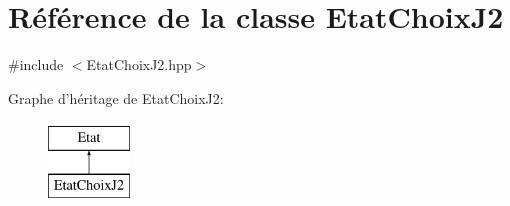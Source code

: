 \hypertarget{class_etat_choix_j2}{\section{Référence de la classe Etat\-Choix\-J2}
\label{class_etat_choix_j2}
}


{\ttfamily \#include $<$Etat\-Choix\-J2.\-hpp$>$}

Graphe d'héritage de Etat\-Choix\-J2\-:\begin{figure}[H]
\begin{center}
\leavevmode
\includegraphics[height=2.000000cm]{class_etat_choix_j2}
\end{center}
\end{figure}
